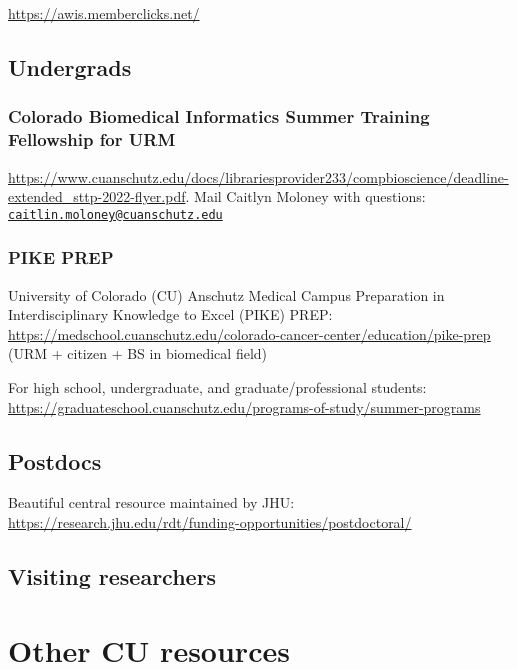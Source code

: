 \documentclass[
  letterpaper,
  DIV=11,
  numbers=noendperiod]{scrreprt}
\begin{document}
\url{https://awis.memberclicks.net/}

\hypertarget{undergrads}{%
\section{Undergrads}\label{undergrads}}

\hypertarget{colorado-biomedical-informatics-summer-training-fellowship-for-urm}{%
\subsection{Colorado Biomedical Informatics Summer Training Fellowship
for
URM}\label{colorado-biomedical-informatics-summer-training-fellowship-for-urm}}

\url{https://www.cuanschutz.edu/docs/librariesprovider233/compbioscience/deadline-extended_sttp-2022-flyer.pdf}.
Mail Caitlyn Moloney with questions:
\href{mailto:caitlin.moloney@cuanschutz.edu}{\nolinkurl{caitlin.moloney@cuanschutz.edu}}

\hypertarget{pike-prep}{%
\subsection{PIKE PREP}\label{pike-prep}}

University of Colorado (CU) Anschutz Medical Campus Preparation in
Interdisciplinary Knowledge to Excel (PIKE) PREP:
\url{https://medschool.cuanschutz.edu/colorado-cancer-center/education/pike-prep}
(URM + citizen + BS in biomedical field)

For high school, undergraduate, and graduate/professional students:
\url{https://graduateschool.cuanschutz.edu/programs-of-study/summer-programs}

\hypertarget{postdocs}{%
\section{Postdocs}\label{postdocs}}

Beautiful central resource maintained by JHU:
\url{https://research.jhu.edu/rdt/funding-opportunities/postdoctoral/}

\hypertarget{visiting-researchers}{%
\section{Visiting researchers}\label{visiting-researchers}}


\hypertarget{other-cu-resources}{%
\chapter{Other CU resources}\label{other-cu-resources}}
\end{document}
